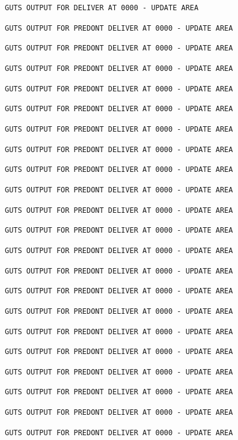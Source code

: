 

\texttt{GUTS OUTPUT FOR  DELIVER AT 0000 - UPDATE AREA}

\texttt{GUTS OUTPUT FOR PREDONT DELIVER AT 0000 - UPDATE AREA}

\texttt{GUTS OUTPUT FOR PREDONT DELIVER AT 0000 - UPDATE AREA}

\texttt{GUTS OUTPUT FOR PREDONT DELIVER AT 0000 - UPDATE AREA}

\texttt{GUTS OUTPUT FOR PREDONT DELIVER AT 0000 - UPDATE AREA}

\texttt{GUTS OUTPUT FOR PREDONT DELIVER AT 0000 - UPDATE AREA}

\texttt{GUTS OUTPUT FOR PREDONT DELIVER AT 0000 - UPDATE AREA}

\texttt{GUTS OUTPUT FOR PREDONT DELIVER AT 0000 - UPDATE AREA}

\texttt{GUTS OUTPUT FOR PREDONT DELIVER AT 0000 - UPDATE AREA}

\texttt{GUTS OUTPUT FOR PREDONT DELIVER AT 0000 - UPDATE AREA}

\texttt{GUTS OUTPUT FOR PREDONT DELIVER AT 0000 - UPDATE AREA}

\texttt{GUTS OUTPUT FOR PREDONT DELIVER AT 0000 - UPDATE AREA}

\texttt{GUTS OUTPUT FOR PREDONT DELIVER AT 0000 - UPDATE AREA}

\texttt{GUTS OUTPUT FOR PREDONT DELIVER AT 0000 - UPDATE AREA}

\texttt{GUTS OUTPUT FOR PREDONT DELIVER AT 0000 - UPDATE AREA}

\texttt{GUTS OUTPUT FOR PREDONT DELIVER AT 0000 - UPDATE AREA}

\texttt{GUTS OUTPUT FOR PREDONT DELIVER AT 0000 - UPDATE AREA}

\texttt{GUTS OUTPUT FOR PREDONT DELIVER AT 0000 - UPDATE AREA}

\texttt{GUTS OUTPUT FOR PREDONT DELIVER AT 0000 - UPDATE AREA}

\texttt{GUTS OUTPUT FOR PREDONT DELIVER AT 0000 - UPDATE AREA}

\texttt{GUTS OUTPUT FOR PREDONT DELIVER AT 0000 - UPDATE AREA}

\texttt{GUTS OUTPUT FOR PREDONT DELIVER AT 0000 - UPDATE AREA}

